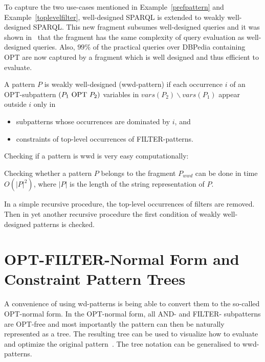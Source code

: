 To capture the two use-cases mentioned in
Example~\ref{prefpattern} and Example~\ref{toplevelfilter}, well-designed SPARQL is extended to weakly well-designed SPARQL.
This new fragment subsumes well-designed queries and it was shown in~\cite{kaminski_bwd} 
that the fragment has the same complexity 
of query evaluation as well-designed queries. 
Also, $99\%$ of the practical queries over DBPedia containing OPT are now captured by a 
fragment which is well designed and thus efficient to evaluate.

\begin{definition}
	A pattern $P$ is weakly well-designed (wwd-pattern) if each occurrence $i$
	of an OPT-subpattern  $(P_1\mbox{ OPT } P_2)$ variables in $vars(P_2) \backslash
	vars(P_1)$ appear outside $i$ only in
	\begin{itemize}
		\item subpatterns whose occurrences are dominated by $i$, and
		\item constraints of top-level occurrences of FILTER-patterns.
	\end{itemize}
\end{definition}
Checking if a pattern is wwd is very easy computationally:
\begin{proposition}
	Checking whether a pattern $P$ belongs to the fragment $P_{wwd}$ can be done
	in time $O(|P|^2)$, where $|P|$ is the length of the string representation
	of $P$.
\end{proposition}
\begin{proofidea}
	In a simple recursive procedure, the top-level occurrences of filters are
	removed.  Then in yet another recursive procedure  the first condition of
	weakly well-designed patterns is checked. 
\end{proofidea}

\section{OPT-FILTER-Normal Form and Constraint Pattern Trees}
A convenience of using wd-patterns is being able to convert them to the so-called
OPT-normal form. In the OPT-normal form, all AND- and FILTER- subpatterns are
OPT-free and most importantly the pattern can then be naturally represented as a
tree. The resulting tree can be used to visualize how to evaluate and optimize
the original pattern~\cite{letelier2013static, pichler2014containment}. The tree
notation can be generalised to wwd-patterns.

